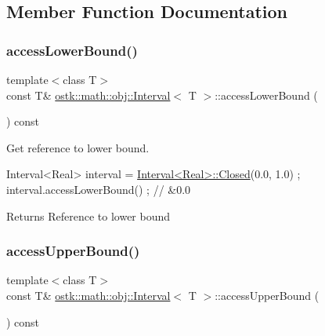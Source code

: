 \subsection{Member Function Documentation}
\mbox{\label{classostk_1_1math_1_1obj_1_1_interval_ae2c364698fdfffb5b475da8c601c2ef9}} 
\subsubsection{\texorpdfstring{access\+Lower\+Bound()}{accessLowerBound()}}
{\footnotesize\ttfamily template$<$class T$>$ \\
const T\& \hyperlink{classostk_1_1math_1_1obj_1_1_interval}{ostk\+::math\+::obj\+::\+Interval}$<$ T $>$\+::access\+Lower\+Bound (\begin{DoxyParamCaption}{ }\end{DoxyParamCaption}) const}



Get reference to lower bound. 


\begin{DoxyCode}
Interval<Real> interval = \hyperlink{classostk_1_1math_1_1obj_1_1_interval_a48e9f436e8994c49026a1ecd503bc190}{Interval<Real>::Closed}(0.0, 1.0) ;
interval.accessLowerBound() ; \textcolor{comment}{// &0.0}
\end{DoxyCode}


\begin{DoxyReturn}{Returns}
Reference to lower bound 
\end{DoxyReturn}
\mbox{\label{classostk_1_1math_1_1obj_1_1_interval_a331c854897280447909268984716c7b2}} 
\subsubsection{\texorpdfstring{access\+Upper\+Bound()}{accessUpperBound()}}
{\footnotesize\ttfamily template$<$class T$>$ \\
const T\& \hyperlink{classostk_1_1math_1_1obj_1_1_interval}{ostk\+::math\+::obj\+::\+Interval}$<$ T $>$\+::access\+Upper\+Bound (\begin{DoxyParamCaption}{ }\end{DoxyParamCaption}) const}



